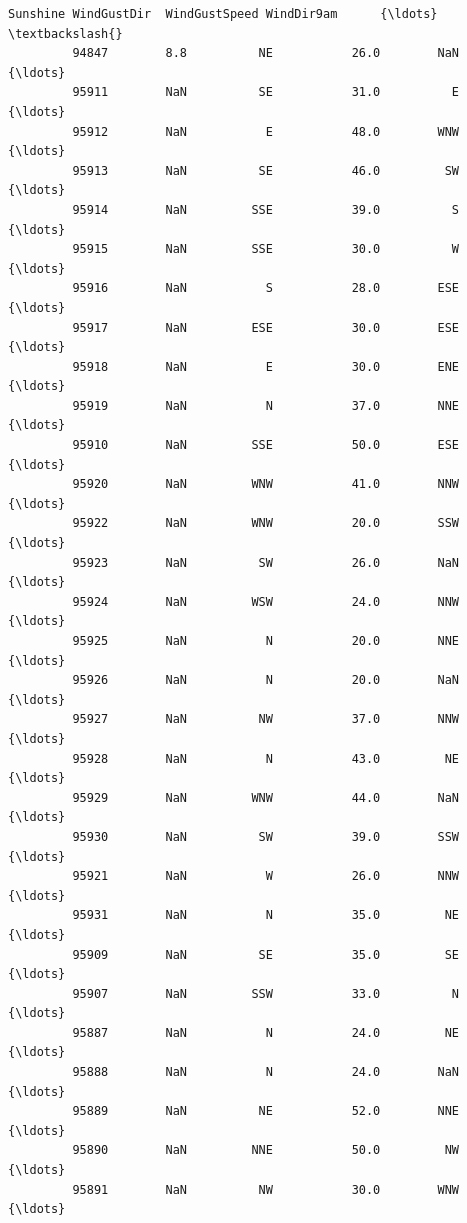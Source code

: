 \documentclass[11pt]{article}
\begin{document}
\begin{Verbatim}[commandchars=\\\{\}]
                 Sunshine WindGustDir  WindGustSpeed WindDir9am      {\ldots}       \textbackslash{}
         94847        8.8          NE           26.0        NaN      {\ldots}        
         95911        NaN          SE           31.0          E      {\ldots}        
         95912        NaN           E           48.0        WNW      {\ldots}        
         95913        NaN          SE           46.0         SW      {\ldots}        
         95914        NaN         SSE           39.0          S      {\ldots}        
         95915        NaN         SSE           30.0          W      {\ldots}        
         95916        NaN           S           28.0        ESE      {\ldots}        
         95917        NaN         ESE           30.0        ESE      {\ldots}        
         95918        NaN           E           30.0        ENE      {\ldots}        
         95919        NaN           N           37.0        NNE      {\ldots}        
         95910        NaN         SSE           50.0        ESE      {\ldots}        
         95920        NaN         WNW           41.0        NNW      {\ldots}        
         95922        NaN         WNW           20.0        SSW      {\ldots}        
         95923        NaN          SW           26.0        NaN      {\ldots}        
         95924        NaN         WSW           24.0        NNW      {\ldots}        
         95925        NaN           N           20.0        NNE      {\ldots}        
         95926        NaN           N           20.0        NaN      {\ldots}        
         95927        NaN          NW           37.0        NNW      {\ldots}        
         95928        NaN           N           43.0         NE      {\ldots}        
         95929        NaN         WNW           44.0        NaN      {\ldots}        
         95930        NaN          SW           39.0        SSW      {\ldots}        
         95921        NaN           W           26.0        NNW      {\ldots}        
         95931        NaN           N           35.0         NE      {\ldots}        
         95909        NaN          SE           35.0         SE      {\ldots}        
         95907        NaN         SSW           33.0          N      {\ldots}        
         95887        NaN           N           24.0         NE      {\ldots}        
         95888        NaN           N           24.0        NaN      {\ldots}        
         95889        NaN          NE           52.0        NNE      {\ldots}        
         95890        NaN         NNE           50.0         NW      {\ldots}        
         95891        NaN          NW           30.0        WNW      {\ldots}        

\end{Verbatim}
\end{document}
